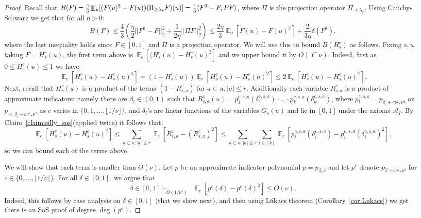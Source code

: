 \documentclass[11pt]{article}
\DeclareMathOperator*{\E}{\mathbb{E}}
\DeclarePairedDelimiter\ip{\langle}{\rangle}
\def \cA {\mathcal{A}}
\def \tO {\widetilde{O}}
\def \sos {SoS\xspace}
\theoremstyle{definition}
\begin{document}
\begin{proof}
Recall that $B(F) = \frac{4}{3}\E_u[(F(u)^3 - F(u))(\Pi_{\geq \lambda_r}F)(u)] = \frac{4}{3}\ip{F^3 - F, PF}$, where $\Pi$ is the projection operator $\Pi_{\geq \lambda_r}$. Using Cauchy-Schwarz we get that for all $\eta > 0$:
\begin{equation}\label{eq:bool-cs}
B(F) \leq \frac{4}{3}\left(\frac{\eta}{2}||F^3 - F||_2^2 + \frac{1}{2\eta}||\Pi F||_2^2\right) \leq \frac{2\eta}{3}\E_u[F(u) -F(u)^3] + \frac{2}{3\eta}\delta(F^2),
\end{equation}
where the last inequality holds since $F \in [0,1]$ and $\Pi$ is a projection operator. We will use this 
to bound $B(H_s^c)$ as follows. 
Fixing $s, u$, taking $F = H_s^c(u)$, 
the first term above is 
$\E_c[(H_s^c(u)-H_s^c(u)^3]$ and we upper bound it 
by $O(\ell^r\nu)$. Indeed, first as 
$0\leq H_s^c(u)\leq 1$ we have
\begin{equation}\label{eq:bool1}
\E_c[H_s^c(u) - H_s^c(u)^3] = (1+H_s^c(u))\E_c[H_s^c(u) - H_s^c(u)^2] \leq 2 \E_c[H_s^c(u) - H_s^c(u)^2].    
\end{equation}
Next, recall that $H_s^c(u)$ is a product of the terms $(1-R^c_{s,a})$ for $a \subset u, |a| \leq r$. Additionally each variable $R^c_{s,a}$ is a product of approximate indicators: namely there are $\beta_i \in (0,1)$  such that $R_{s,a}^c(u) = p^{c,s,a}_1(\delta^{c,s,a}_1)\cdot \ldots\cdot p^{c,s,a}_k(\delta^{c,s,a}_k)$, where $p^{c,s,a}_i = p_{\beta_i+c\nu^2,\nu^2}$ or $p_{<\beta_i+c\nu^2,\nu^2}$ as $c$ varies in $\{0,1,\ldots,\lfloor 1/\nu \rfloor\}$, and $\delta_i$'s are linear functions of the variables $G_s(u)$ and lie in $[0,1]$ under the axioms $\cA_I$.
By Claim~\ref{claim:silly_sos}(applied twice) it follows that:
\[\E_c[H_s^c(u) - H_s^c(u)^2] \leq \sum_{a \subset u: |a|\leq r}\E_c[R^c_{s,a} - (R^c_{s,a})^2] \leq \sum_{a \subset u: |a|\leq r}\sum_{i \in [k]}\E_c[p_i^{c,s,a}(\delta^{c,s,a}_i) - p_i^{c,s,a}(\delta^{c,s,a}_i)^2],\]
so we can bound each of the terms above.  

We will show that each term is smaller than $O(\nu)$. Let $p$ be an approximate indicator polynomial $p = p_{\beta,\nu}$ and let $p^c$ denote $p_{\beta+c\nu^2,\nu^2}$ for $c \in \{0,\ldots,\lfloor 1/\nu\rfloor\}$. For all $\delta \in [0,1]$, we argue that
\begin{equation}\label{eq:bool-random}
\delta \in [0,1] \vdash_{\tO(1/\nu^2)} ~~ \E_c[p^c(\delta) - p^c(\delta)^2] \leq O(\nu).
\end{equation}
Indeed, this follows by case analysis on $\delta \in [0,1]$ (that we show next), and then using L\'{u}kacs theorem (Corollary~\ref{cor:Lukacs}) we get there is an \sos proof of degree $\deg(p^c)$. 


\end{proof}
\end{document}
